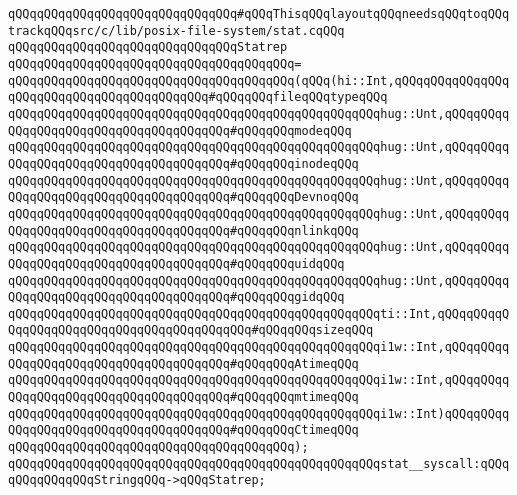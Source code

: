 \newline
\verb|qQQqqQQqqQQqqQQqqQQqqQQqqQQqqQQq#qQQqThisqQQqlayoutqQQqneedsqQQqtoqQQqtrackqQQqsrc/c/lib/posix-file-system/stat.cqQQq|\newline
\verb|qQQqqQQqqQQqqQQqqQQqqQQqqQQqqQQqStatrep|\newline
\verb|qQQqqQQqqQQqqQQqqQQqqQQqqQQqqQQqqQQqqQQq=|\newline
\verb|qQQqqQQqqQQqqQQqqQQqqQQqqQQqqQQqqQQqqQQq(qQQq(hi::Int,qQQqqQQqqQQqqQQqqQQqqQQqqQQqqQQqqQQqqQQqqQQq#qQQqqQQqfileqQQqtypeqQQq|\newline
\verb|qQQqqQQqqQQqqQQqqQQqqQQqqQQqqQQqqQQqqQQqqQQqqQQqqQQqhug::Unt,qQQqqQQqqQQqqQQqqQQqqQQqqQQqqQQqqQQqqQQq#qQQqqQQqmodeqQQq|\newline
\verb|qQQqqQQqqQQqqQQqqQQqqQQqqQQqqQQqqQQqqQQqqQQqqQQqqQQqhug::Unt,qQQqqQQqqQQqqQQqqQQqqQQqqQQqqQQqqQQqqQQq#qQQqqQQqinodeqQQq|\newline
\verb|qQQqqQQqqQQqqQQqqQQqqQQqqQQqqQQqqQQqqQQqqQQqqQQqqQQqhug::Unt,qQQqqQQqqQQqqQQqqQQqqQQqqQQqqQQqqQQqqQQq#qQQqqQQqDevnoqQQq|\newline
\verb|qQQqqQQqqQQqqQQqqQQqqQQqqQQqqQQqqQQqqQQqqQQqqQQqqQQqhug::Unt,qQQqqQQqqQQqqQQqqQQqqQQqqQQqqQQqqQQqqQQq#qQQqqQQqnlinkqQQq|\newline
\verb|qQQqqQQqqQQqqQQqqQQqqQQqqQQqqQQqqQQqqQQqqQQqqQQqqQQqhug::Unt,qQQqqQQqqQQqqQQqqQQqqQQqqQQqqQQqqQQqqQQq#qQQqqQQquidqQQq|\newline
\verb|qQQqqQQqqQQqqQQqqQQqqQQqqQQqqQQqqQQqqQQqqQQqqQQqqQQqhug::Unt,qQQqqQQqqQQqqQQqqQQqqQQqqQQqqQQqqQQqqQQq#qQQqqQQqgidqQQq|\newline
\verb|qQQqqQQqqQQqqQQqqQQqqQQqqQQqqQQqqQQqqQQqqQQqqQQqqQQqti::Int,qQQqqQQqqQQqqQQqqQQqqQQqqQQqqQQqqQQqqQQqqQQq#qQQqqQQqsizeqQQq|\newline
\verb|qQQqqQQqqQQqqQQqqQQqqQQqqQQqqQQqqQQqqQQqqQQqqQQqqQQqi1w::Int,qQQqqQQqqQQqqQQqqQQqqQQqqQQqqQQqqQQqqQQq#qQQqqQQqAtimeqQQq|\newline
\verb|qQQqqQQqqQQqqQQqqQQqqQQqqQQqqQQqqQQqqQQqqQQqqQQqqQQqi1w::Int,qQQqqQQqqQQqqQQqqQQqqQQqqQQqqQQqqQQqqQQq#qQQqqQQqmtimeqQQq|\newline
\verb|qQQqqQQqqQQqqQQqqQQqqQQqqQQqqQQqqQQqqQQqqQQqqQQqqQQqi1w::Int)qQQqqQQqqQQqqQQqqQQqqQQqqQQqqQQqqQQqqQQq#qQQqqQQqCtimeqQQq|\newline
\verb|qQQqqQQqqQQqqQQqqQQqqQQqqQQqqQQqqQQqqQQq);|\newline
\newline
\verb|qQQqqQQqqQQqqQQqqQQqqQQqqQQqqQQqqQQqqQQqqQQqqQQqqQQqstat__syscall:qQQqqQQqqQQqqQQqStringqQQq->qQQqStatrep;|\newline
